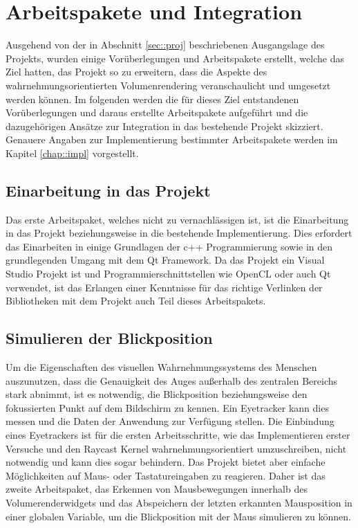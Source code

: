 \section{Arbeitspakete und Integration}\label{sec::workpacks}
Ausgehend von der in Abschnitt \ref{sec::proj} beschriebenen Ausgangslage des Projekts, wurden einige Vorüberlegungen und Arbeitspakete erstellt, welche das Ziel hatten, das Projekt so zu erweitern, dass die Aspekte des wahrnehmungsorientierten Volumenrendering veranschaulicht und umgesetzt werden können.
Im folgenden werden die für dieses Ziel entstandenen Vorüberlegungen und daraus erstellte Arbeitspakete aufgeführt und die dazugehörigen Ansätze zur Integration in das bestehende Projekt skizziert.
Genauere Angaben zur Implementierung bestimmter Arbeitspakete werden im Kapitel \ref{chap::impl} vorgestellt.

\subsection{Einarbeitung in das Projekt}
Das erste Arbeitspaket, welches nicht zu vernachlässigen ist, ist die Einarbeitung in das Projekt beziehungsweise in die bestehende Implementierung.
Dies erfordert das Einarbeiten in einige Grundlagen der c++ Programmierung sowie in den grundlegenden Umgang mit dem Qt Framework.
Da das Projekt ein Visual Studio Projekt ist und Programmierschnittstellen wie OpenCL oder auch Qt verwendet, ist das Erlangen einer Kenntnisse für das richtige Verlinken der Bibliotheken mit dem Projekt auch Teil dieses Arbeitspakets.

\subsection{Simulieren der Blickposition}
Um die Eigenschaften des visuellen Wahrnehmungssystems des Menschen auszunutzen, dass die Genauigkeit des Auges außerhalb des zentralen Bereichs stark abnimmt, ist es notwendig, die Blickposition beziehungsweise den fokussierten Punkt auf dem Bildschirm zu kennen.
Ein Eyetracker kann dies messen und die Daten der Anwendung zur Verfügung stellen.
Die Einbindung eines Eyetrackers ist für die ersten Arbeitsschritte, wie das Implementieren erster Versuche und den Raycast Kernel wahrnehmungsorientiert umzuschreiben, nicht notwendig und kann dies sogar behindern.
Das Projekt bietet aber einfache Möglichkeiten auf Maus- oder Tastatureingaben zu reagieren.
Daher ist das zweite Arbeitspaket, das Erkennen von Mausbewegungen innerhalb des Volumerenderwidgets und das Abspeichern der letzten erkannten Mausposition in einer globalen Variable, um die Blickposition mit der Maus simulieren zu können.

